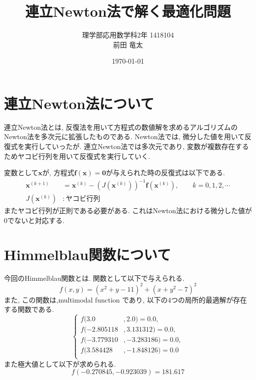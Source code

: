 \documentclass[12pt,a4paper]{jsarticle}
\begin{document}
\begin{titlepage}
\title{連立Newton法で解く最適化問題}
\author{理学部応用数学科2年 $$1418104 \\前田 竜太}
\date{\today}
\maketitle
\thispagestyle{empty}
\end{titlepage}

\section{連立Newton法について}
連立Newton法とは, 反復法を用いて方程式の数値解を求めるアルゴリズムのNewton法を多次元に拡張したものである. Newton法では, 微分した値を用いて反復式を実行していったが. 連立Newton法では多次元であり, 変数が複数存在するためヤコビ行列を用いて反復式を実行していく.

変数として$\bm{x}$が, 方程式$\bm{f}(\bm{x})=\bm{0}$が与えられた時の反復式は以下である.
\begin{equation*}
\begin{aligned}
  \bm{x}^{(k+1)} &= \bm{x}^{(k)} - (J(\bm{x}^{(k)}))^{-1}\bm{f}(\bm{x}^{(k)}), \qquad k = 0, 1, 2, \cdots \\
  J(\bm{x}^{(k)})&:ヤコビ行列
\end{aligned}
\end{equation*}
またヤコビ行列が正則である必要がある. これはNewton法における微分した値が0でないと対応する.

\section{Himmelblau関数について}
今回のHimmelblau関数とは. 関数として以下で与えられる.
\[ f(x, y) = (x^2 + y - 11)^2 + (x + y^2 - 7)^2 \]
また, この関数は,multimodal function であり, 以下の4つの局所的最適解が存在する関数である.
\begin{equation*}
\left\{
\begin{aligned}
  f(3.0&, 2.0) = 0.0, \\
    f(-2.805118&, 3.131312) = 0.0, \\
    f(-3.779310&, -3.283186) = 0.0, \\
    f(3.584428&, -1.848126) = 0.0 \\
\end{aligned}
\right.
\end{equation*}
また極大値として以下が求められる.
\[ f(-0.270845, -0.923039) = 181.617\]
\end{document}
